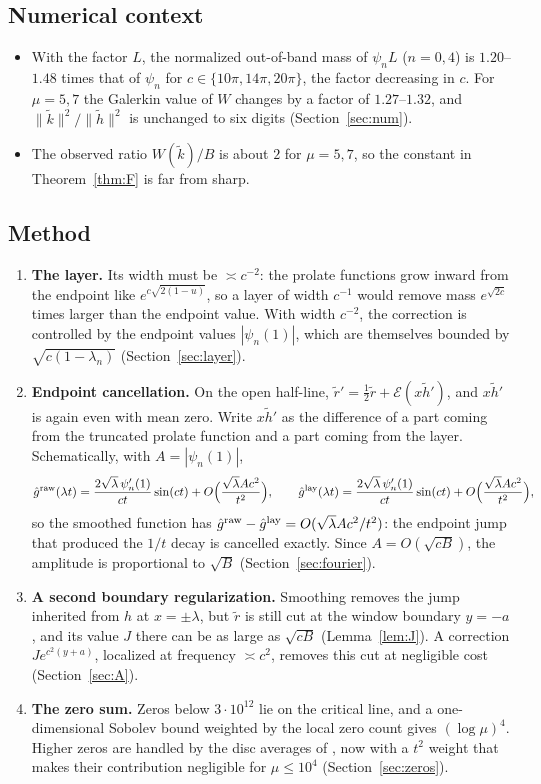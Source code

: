 \documentclass[11pt]{amsart}
\theoremstyle{remark}
\numberwithin{equation}{section}
\newcommand{\E}{\mathcal{E}}
\begin{document}
\subsection{Numerical context}
\begin{itemize}
\item With the factor $L$, the normalized out-of-band mass of $\psi_nL$ ($n=0,4$) is $1.20$--$1.48$ times that of $\psi_n$ for $c\in\{10\pi,14\pi,20\pi\}$, the factor decreasing in $c$. For $\mu=5,7$ the Galerkin value of $W$ changes by a factor of $1.27$--$1.32$, and $\|\tilde k\|^2/\|\tilde h\|^2$ is unchanged to six digits (Section~\ref{sec:num}).
\item The observed ratio $W(\tilde k)/B$ is about $2$ for $\mu=5,7$, so the constant in Theorem~\ref{thm:F} is far from sharp.
\end{itemize}

\subsection{Method}
\begin{enumerate}
\item \textbf{The layer.} Its width must be $\asymp c^{-2}$: the prolate functions grow inward from the endpoint like $e^{c\sqrt{2(1-u)}}$, so a layer of width $c^{-1}$ would remove mass $e^{\sqrt{2c}}$ times larger than the endpoint value. With width $c^{-2}$, the correction is controlled by the endpoint values $|\psi_n(1)|$, which are themselves bounded by $\sqrt{c(1-\lambda_n)}$ (Section~\ref{sec:layer}).
\item \textbf{Endpoint cancellation.} On the open half-line, $\tilde r'=\frac12\tilde r+\E(x\tilde h')$, and $x\tilde h'$ is again even with mean zero. Write $x\tilde h'$ as the difference of a part coming from the truncated prolate function and a part coming from the layer. Schematically, with $A=|\psi_n(1)|$,
\[
\hat g^{\rm raw}(\lambda t)=\frac{2\sqrt\lambda\,\psi_n'(1)}{ct}\sin(ct)+O\Bigl(\frac{\sqrt\lambda Ac^2}{t^2}\Bigr),\qquad
\hat g^{\rm lay}(\lambda t)=\frac{2\sqrt\lambda\,\psi_n'(1)}{ct}\sin(ct)+O\Bigl(\frac{\sqrt\lambda Ac^2}{t^2}\Bigr),
\]
so the smoothed function has $\hat g^{\rm raw}-\hat g^{\rm lay}=O(\sqrt\lambda Ac^2/t^2)$: the endpoint jump that produced the $1/t$ decay is cancelled exactly. Since $A=O(\sqrt{cB})$, the amplitude is proportional to $\sqrt B$ (Section~\ref{sec:fourier}).
\item \textbf{A second boundary regularization.} Smoothing removes the jump inherited from $h$ at $x=\pm\lambda$, but $\tilde r$ is still cut at the window boundary $y=-a$, and its value $J$ there can be as large as $\sqrt{cB}$ (Lemma~\ref{lem:J}). A correction $Je^{c^2(y+a)}$, localized at frequency $\asymp c^2$, removes this cut at negligible cost (Section~\ref{sec:A}).
\item \textbf{The zero sum.} Zeros below $3\cdot10^{12}$ lie on the critical line, and a one-dimensional Sobolev bound weighted by the local zero count gives $(\log\mu)^4$. Higher zeros are handled by the disc averages of \cite{MoriWeilII}, now with a $t^2$ weight that makes their contribution negligible for $\mu\le10^4$ (Section~\ref{sec:zeros}).
\end{enumerate}
\end{document}
